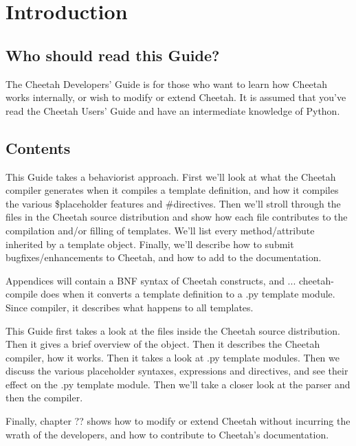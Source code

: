 \section{Introduction}

\subsection{Who should read this Guide?}

The Cheetah Developers' Guide is for those who want to learn how Cheetah works
internally, or wish to modify or extend Cheetah.  It is assumed that
you've read the Cheetah Users' Guide and have an intermediate knowledge of
Python.

\subsection{Contents}

This Guide takes a behaviorist approach.  First we'll look at what the
Cheetah compiler generates when it compiles a template definition, and
how it compiles the various \$placeholder features and \#directives.
Then we'll stroll through the files in the Cheetah source distribution
and show how each file contributes to the compilation and/or filling of
templates.  We'll list every method/attribute inherited by a template
object.  Finally, we'll describe how to submit
bugfixes/enhancements to Cheetah, and how to add to the documentation.

Appendices will contain a BNF syntax of Cheetah constructs, and ...
cheetah-compile does when it converts a template definition to a .py
template module.  Since 
compiler, it describes what happens to all templates.  

This Guide first takes a look at the files inside the Cheetah source
distribution.  Then it gives a brief overview of the  object.
Then it describes the Cheetah compiler, how it works.  Then it takes a look at
.py template modules.  Then we discuss the various placeholder syntaxes,
expressions and directives, and see their effect on the .py template module.
Then we'll take a closer look at the parser and then the compiler.

Finally, chapter ?? shows how to modify or extend Cheetah without incurring
the wrath of the developers, and how to contribute to Cheetah's documentation.

